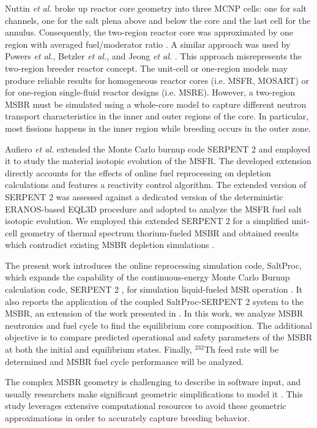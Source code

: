 Nuttin \emph{et al.} broke up reactor core geometry into three \gls{MCNP} cells: 
one for salt channels, one for the salt plena above and below the core and the 
last cell for the annulus. Consequently, the two-region reactor core was 
approximated by one region with averaged fuel/moderator ratio 
\cite{nuttin_potential_2005}.  A similar approach was used by Powers \emph{et 
al.}, Betzler \emph{et al.}, and Jeong \emph{et al.} 
\cite{powers_new_2013,powers_inventory_2014,betzler_modeling_2016, 
betzler_molten_2017, jeong_development_2014, jeong_equilibrium_2016}. This approach 
misrepresents the two-region breeder reactor concept. The unit-cell or one-region 
models may produce reliable results for homogeneous reactor cores (i.e. 
\gls{MSFR}, \gls{MOSART}) or for one-region single-fluid reactor designs (i.e. 
\gls{MSRE}). However, a two-region \gls{MSBR} must be simulated using a whole-core 
model to capture different neutron transport characteristics in the inner and 
outer regions of the core. In particular, most fissions happens in the inner 
region while breeding occurs in the outer zone.  

Aufiero \emph{et al.} extended the Monte Carlo burnup code SERPENT 2 and 
employed it to study the material isotopic evolution of the \gls{MSFR}. The 
developed extension directly accounts for the effects of online fuel 
reprocessing on depletion calculations and features a reactivity control 
algorithm. The extended version of SERPENT 2 was assessed against a dedicated 
version of the deterministic ERANOS-based EQL3D procedure 
\cite{ruggieri_eranos_2006} and adopted to analyze the \gls{MSFR} fuel salt 
isotopic evolution. We employed this extended SERPENT 2 for a simplified 
unit-cell geometry of thermal spectrum thorium-fueled \gls{MSBR} and obtained 
results which contradict existing \gls{MSBR} depletion simulations 
\cite{jeong_equilibrium_2016}.

The present work introduces the online reprocessing simulation code, SaltProc, 
which expands the capability of the continuous-energy Monte Carlo Burnup 
calculation code, SERPENT 2 \cite{leppanen_serpent_2015-1}, for simulation 
liquid-fueled \gls{MSR} operation 
\cite{andrei_rykhlevskii_arfc/saltproc:_2018}. It also reports the 
application of the coupled SaltProc-SERPENT 2 system to the \gls{MSBR}, an 
extension of the work presented in 
\cite{rykhlevskii_full-core_2017, rykhlevskii_online_2017}. In this work, we 
analyze \gls{MSBR} neutronics and fuel cycle to find 
the equilibrium core composition. The additional objective 
is to compare predicted operational and safety parameters of the \gls{MSBR} at 
both the initial and equilibrium states. Finally, $^{232}$Th feed rate will be 
determined and \gls{MSBR} fuel cycle performance will be analyzed.

The complex \gls{MSBR} geometry is challenging to describe in software input, 
and usually researchers make significant geometric simplifications to model it 
\cite{park_whole_2015}. This study leverages extensive computational 
resources to avoid these geometric approximations in order to accurately capture 
breeding behavior. 
